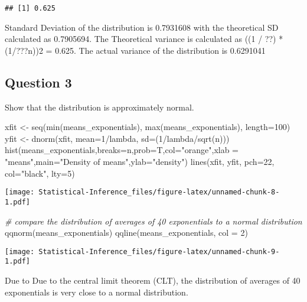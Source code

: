 \documentclass[
]{article}
\newenvironment{Shaded}{\begin{snugshade}}{\end{snugshade}}
\newcommand{\AttributeTok}[1]{\textcolor[rgb]{0.77,0.63,0.00}{#1}}
\newcommand{\CommentTok}[1]{\textcolor[rgb]{0.56,0.35,0.01}{\textit{#1}}}
\newcommand{\DecValTok}[1]{\textcolor[rgb]{0.00,0.00,0.81}{#1}}
\newcommand{\FunctionTok}[1]{\textcolor[rgb]{0.00,0.00,0.00}{#1}}
\newcommand{\NormalTok}[1]{#1}
\newcommand{\OtherTok}[1]{\textcolor[rgb]{0.56,0.35,0.01}{#1}}
\newcommand{\SpecialCharTok}[1]{\textcolor[rgb]{0.00,0.00,0.00}{#1}}
\newcommand{\StringTok}[1]{\textcolor[rgb]{0.31,0.60,0.02}{#1}}
\begin{document}
\begin{verbatim}
## [1] 0.625
\end{verbatim}

Standard Deviation of the distribution is 0.7931608 with the theoretical
SD calculated as 0.7905694. The Theoretical variance is calculated as
((1 / ??) * (1/???n))2 = 0.625. The actual variance of the distribution
is 0.6291041

\hypertarget{question-3}{%
\subsection{Question 3}\label{question-3}}

Show that the distribution is approximately normal.

\begin{Shaded}
\begin{Highlighting}[]
\NormalTok{xfit }\OtherTok{\textless{}{-}} \FunctionTok{seq}\NormalTok{(}\FunctionTok{min}\NormalTok{(means\_exponentials), }\FunctionTok{max}\NormalTok{(means\_exponentials), }\AttributeTok{length=}\DecValTok{100}\NormalTok{)}
\NormalTok{yfit }\OtherTok{\textless{}{-}} \FunctionTok{dnorm}\NormalTok{(xfit, }\AttributeTok{mean=}\DecValTok{1}\SpecialCharTok{/}\NormalTok{lambda, }\AttributeTok{sd=}\NormalTok{(}\DecValTok{1}\SpecialCharTok{/}\NormalTok{lambda}\SpecialCharTok{/}\FunctionTok{sqrt}\NormalTok{(n)))}
\FunctionTok{hist}\NormalTok{(means\_exponentials,}\AttributeTok{breaks=}\NormalTok{n,}\AttributeTok{prob=}\NormalTok{T,}\AttributeTok{col=}\StringTok{"orange"}\NormalTok{,}\AttributeTok{xlab =} \StringTok{"means"}\NormalTok{,}\AttributeTok{main=}\StringTok{"Density of means"}\NormalTok{,}\AttributeTok{ylab=}\StringTok{"density"}\NormalTok{)}
\FunctionTok{lines}\NormalTok{(xfit, yfit, }\AttributeTok{pch=}\DecValTok{22}\NormalTok{, }\AttributeTok{col=}\StringTok{"black"}\NormalTok{, }\AttributeTok{lty=}\DecValTok{5}\NormalTok{)}
\end{Highlighting}
\end{Shaded}

\texttt{[image: Statistical-Inference\_files/figure-latex/unnamed-chunk-8-1.pdf]}

\begin{Shaded}
\begin{Highlighting}[]
\CommentTok{\# compare the distribution of averages of 40 exponentials to a normal distribution}
\FunctionTok{qqnorm}\NormalTok{(means\_exponentials)}
\FunctionTok{qqline}\NormalTok{(means\_exponentials, }\AttributeTok{col =} \DecValTok{2}\NormalTok{)}
\end{Highlighting}
\end{Shaded}

\texttt{[image: Statistical-Inference\_files/figure-latex/unnamed-chunk-9-1.pdf]}

Due to Due to the central limit theorem (CLT), the distribution of
averages of 40 exponentials is very close to a normal distribution.
\end{document}
